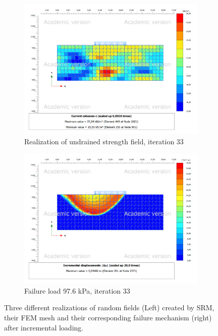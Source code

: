 \begin{figure}
\begin{subfigure}{0.475\textwidth}
    \centering
    \includegraphics[width=\textwidth]{fig/bc/nx/testp20211116-100901}
    \caption[]%
    {{\small Realization of undrained strength field, iteration 33}}
    \label{fig:bc net56}
\end{subfigure}
\begin{subfigure}{0.475\textwidth}
    \centering
    \includegraphics[width=\textwidth]{fig/bc/nx/testutot20211116-100901}
    \caption[]%
    {{\small Failure load 97.6 kPa, iteration 33}}
    \label{fig:bc net66}
\end{subfigure}
\caption[ Three different realizations of random fields created by SRM, their FEM mesh and the failure mechanism after incremental loading.]
	{\small Three different realizations of random fields (Left) created by SRM, their FEM mesh and their corresponding failure mechanism (right) after incremental loading.}
\label{fig:sixbcfields}
\end{figure}
